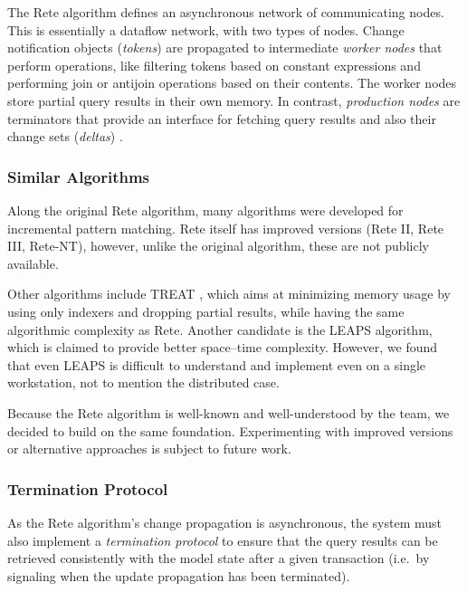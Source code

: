 The Rete algorithm defines an asynchronous network of communicating nodes. This is essentially a dataflow network, with two types of nodes. Change notification objects (\emph{tokens}) are propagated to intermediate \emph{worker nodes} that perform operations, like filtering tokens based on constant expressions and performing join or antijoin operations based on their contents. The worker nodes store partial query results in their own memory. In contrast, \emph{production nodes} are terminators that provide an interface for fetching query results and also their change sets (\emph{deltas}) . %

\subsubsection{Similar Algorithms}

Along the original Rete algorithm, many algorithms were developed for incremental pattern matching. Rete itself has improved versions (Rete II, Rete III, Rete-NT), however, unlike the original algorithm, these are not publicly available. 

Other algorithms include TREAT \cite{Miranker:1991:OPT:627280.627434}, which aims at minimizing memory usage by using only indexers and dropping partial results, while having the same algorithmic complexity as Rete. Another candidate is the LEAPS \cite{Batory:1994:LA:899216} algorithm, which is claimed to provide better space--time complexity. However, we found that even LEAPS is difficult to understand and implement even on a single workstation, not to mention the distributed case. 

Because the Rete algorithm is well-known and well-understood by the \eiq{} team, we decided to build \iqd{} on the same foundation. Experimenting with improved versions or alternative approaches is subject to future work.

\subsubsection{Termination Protocol}

As the Rete algorithm's change propagation is asynchronous, the system must also implement a \emph{termination protocol} to ensure that the query results can be retrieved consistently with the model state after a given transaction (i.e.\ by signaling when the update propagation has been terminated).

